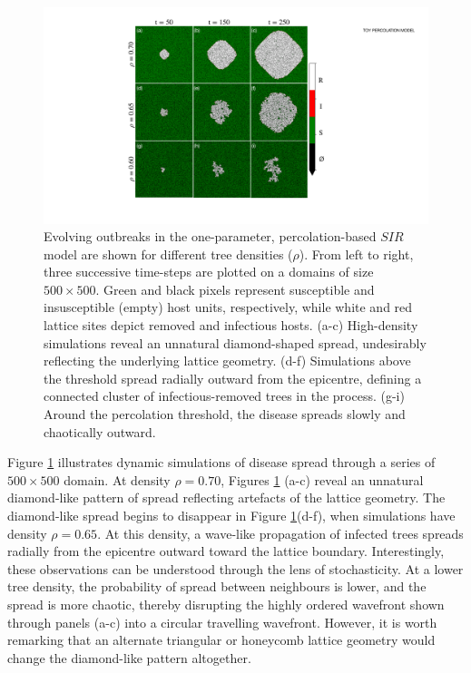 \begin{figure}
    \centering
    \includegraphics[scale=0.50]{chapter3/figures/figure1-1param-perc.pdf}
    \caption{
        Evolving outbreaks in the one-parameter, percolation-based $SIR$ model are shown for different tree densities ($\rho$).
        From left to right, three successive time-steps are plotted on a domains of size $500 \times 500$.
        Green and black pixels represent susceptible and insusceptible (empty) host units, respectively, 
        while white and red lattice sites depict removed and infectious hosts. 
        (a-c) High-density simulations reveal an unnatural diamond-shaped spread, undesirably reflecting the underlying lattice geometry.
        (d-f) Simulations above the threshold spread radially outward from the epicentre, defining a connected cluster of infectious-removed trees in the process. (g-i) Around the percolation threshold, the disease spreads slowly and chaotically outward. 
        }
    \label{fig:ch3-perc-spread}
\end{figure}

Figure \ref{fig:ch3-perc-spread} illustrates dynamic simulations of disease spread through a series of $500 \times 500 $ domain. At density $\rho=0.70$, Figures \ref{fig:ch3-perc-spread} (a-c) reveal an unnatural diamond-like pattern of spread reflecting artefacts of the lattice geometry.
The diamond-like spread begins to disappear in Figure \ref{fig:ch3-perc-spread}(d-f), when simulations have density $\rho=0.65$. At this density, a wave-like propagation of infected trees spreads radially from the epicentre outward toward the lattice boundary. Interestingly, these observations can be understood through the lens of stochasticity. At a lower tree density, the probability of spread between neighbours is lower, and the spread is more chaotic, thereby disrupting the highly ordered wavefront shown through panels (a-c) into a circular travelling wavefront.
However, it is worth remarking that an alternate triangular or honeycomb lattice geometry would change the diamond-like pattern altogether.

